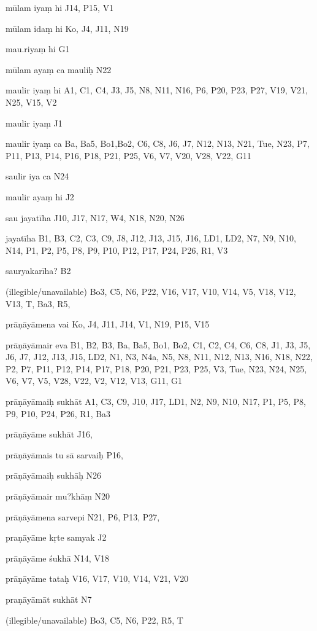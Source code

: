 \begin{ekdosis}
\begin{marma}[hp01_055]
\begin{marma}[hp02_009]
\begin{marma}[hp02_011]
 \begin{marma}[hp02_35d]
\item[mūlam iyaṃ hi] J14, P15, V1
\item[mūlam idaṃ hi] Ko, J4, J11, N19
\item[mau.riyaṃ hi] G1
\item[mūlam ayaṃ ca mauliḥ] N22
\item[maulir iyaṃ hi] A1, C1, C4, J3, J5, N8, N11, N16, P6, P20, P23, P27, V19, V21, N25, V15, V2
\item[maulir iyaṃ] J1
\item[maulir iyaṃ ca] Ba, Ba5, Bo1,Bo2, C6, C8, J6, J7, N12, N13, N21, Tue, N23, P7, P11, P13, P14, P16, P18, P21, P25, V6, V7, V20, V28, V22, G11
\item[saulir iya ca] N24
\item[maulir ayaṃ hi] J2
\item[sau jayatīha] J10, J17, N17, W4, N18, N20, N26
\item[jayatīha] B1, B3, C2, C3, C9, J8, J12, J13, J15, J16, LD1, LD2, N7, N9, N10, N14, P1, P2, P5, P8, P9, P10, P12, P17, P24, P26, R1, V3
\item[sauryakarīha?] B2
\item[(illegible/unavailable)] Bo3, C5, N6, P22, V16, V17, V10, V14, V5, V18, V12, V13, T, Ba3, R5,
  \begin{description}

    \end{description}
 \end{marma}

 \begin{marma}[hp02_38a]
\item[prāṇāyāmena vai] Ko, J4, J11, J14, V1, N19, P15, V15
\item[prāṇāyāmair eva] B1, B2, B3, Ba, Ba5, Bo1, Bo2, C1, C2, C4, C6, C8, J1, J3, J5, J6, J7, J12, J13, J15, LD2, N1, N3, N4a, N5, N8, N11, N12, N13, N16, N18, N22, P2, P7, P11, P12, P14, P17, P18, P20, P21, P23, P25, V3, Tue, N23, N24, N25, V6, V7, V5, V28, V22, V2, V12, V13, G11, G1
\item[prāṇāyāmaiḥ sukhāt] A1, C3, C9, J10, J17, LD1, N2, N9, N10, N17, P1, P5, P8, P9, P10, P24, P26, R1, Ba3
\item[prāṇāyāme sukhāt] J16,
\item[prāṇāyāmais tu sā sarvaiḥ] P16,
\item[prāṇāyāmaiḥ sukhāḥ] N26
\item[prāṇāyāmair mu?khāṃ] N20
\item[prāṇāyāmena sarvepi] N21, P6, P13, P27, 
\item[praṇāyāme kṛte samyak] J2
\item[prāṇāyāme śukhā] N14, V18
\item[prāṇāyāme tataḥ] V16, V17, V10, V14, V21, V20
\item[praṇāyāmāt sukhāt] N7
\item[(illegible/unavailable)] Bo3, C5, N6, P22, R5, T
  \begin{description}


\end{description}
\end{marma}
\end{marma}
\end{marma}
\end{marma}
\end{ekdosis}

